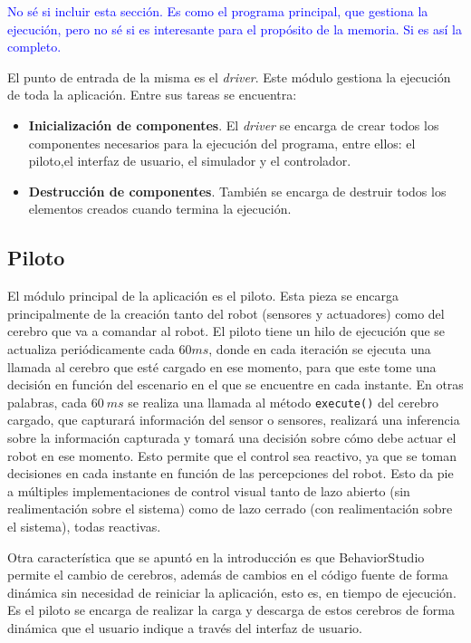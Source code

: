 \textcolor{blue}{No sé si incluir esta sección. Es como el programa principal, que gestiona la ejecución, pero no sé si es interesante para el propósito de la memoria. Si es así la completo.}

El punto de entrada de la misma es el \textit{driver}. Este módulo gestiona la ejecución de toda la aplicación. Entre sus tareas se encuentra:

\begin{itemize}
    \item \textbf{Inicialización de componentes}. El \textit{driver} se encarga de crear todos los componentes necesarios para la ejecución del programa, entre ellos: el piloto,el interfaz de usuario, el simulador y el controlador.
    \item \textbf{Destrucción de componentes}. También se encarga de destruir todos los elementos creados cuando termina la ejecución.
\end{itemize}

\subsection{Piloto}
\label{sec:pilot}

El módulo principal de la aplicación es el piloto. Esta pieza se encarga principalmente de la creación tanto del robot (sensores y actuadores) como del cerebro que va a comandar al robot. El piloto tiene un hilo de ejecución que se actualiza periódicamente cada $ 60 ms $, donde en cada iteración se ejecuta una llamada al cerebro que esté cargado en ese momento, para que este tome una decisión en función del escenario en el que se encuentre en cada instante. En otras palabras, cada $ 60\ ms $ se realiza una llamada al método \lstinline{execute()} del cerebro cargado, que capturará información del sensor o sensores, realizará una inferencia sobre la información capturada y tomará una decisión sobre cómo debe actuar el robot en ese momento. Esto permite que el control sea reactivo, ya que se toman decisiones en cada instante en función de las percepciones del robot. Esto da pie a múltiples implementaciones de control visual tanto de lazo abierto (sin realimentación sobre el sistema) como de lazo cerrado (con realimentación sobre el sistema), todas reactivas.

Otra característica que se apuntó en la introducción es que BehaviorStudio permite el cambio de cerebros, además de cambios en el código fuente de forma dinámica sin necesidad de reiniciar la aplicación, esto es, en tiempo de ejecución. Es el piloto se encarga de realizar la carga y descarga de estos cerebros de forma dinámica que el usuario indique a través del interfaz de usuario.

